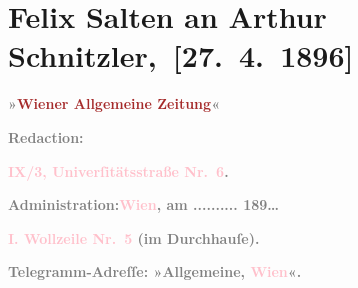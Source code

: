 

\renewcommand{\erwaehntePersonen}{Personen: Julius von Gans-Ludassy, Victorien Sardou}
\renewcommand{\erwaehnteInstitutionen}{Institutionen: Wiener Allgemeine Zeitung}
\renewcommand{\erwaehnteOrte}{Orte: Burgtheater, Café Griensteidl, Universitätsstraße, Wien, Wollzeile}
\renewcommand{\erwaehnteWerke}{Werke: Die alten Junggesellen}
\section[ Felix Salten an Arthur Schnitzler, {[}27. 4. 1896{]}]{Felix Salten an Arthur Schnitzler, {[}27. 4. 1896{]}}
\nopagebreak{}
\rehead{ }\normalsize\beginnumbering{}
\toendnotes[C]{\smallbreak\pagebreak[2]}
\toendnotes[C]{\smallbreak}
\pstart
           \noindent{}{\pb}\textcolor{gray}{\textbf{\textbf{»\textcolor{brown}{Wiener Allgemeine
                        Zeitung}{}\ledrightnote{\textcolor{brown}{Wiener Allgemeine Zeitung}}«}}}\pend
           
\pstart
           \textcolor{gray}{\textbf{Redaction:}}\pend
           
\pstart
           \textcolor{gray}{\textbf{\textbf{\textcolor{pink}{IX/3, Univerſitätsstraße Nr. 6}{}\ledrightnote{\textcolor{pink}{Universitätsstraße}}.}}}\pend
           
\pstart
           \textcolor{gray}{\textbf{Administration:}}\hfill \textcolor{gray}{\textbf{\textcolor{pink}{Wien}{}\ledrightnote{\textcolor{pink}{Wien}}, am ..........{ }189{\dots}}}\pend
           
\pstart
           \textcolor{gray}{\textbf{\textbf{\textcolor{pink}{I. Wollzeile Nr. 5}{}\ledrightnote{\textcolor{pink}{Wollzeile}}} (im Durchhauſe).}}\pend
           
\pstart
           \textcolor{gray}{\textbf{Telegramm-Adreſſe: »Allgemeine, \textcolor{pink}{Wien}{}\ledrightnote{\textcolor{pink}{Wien}}«.}}\pend
           
